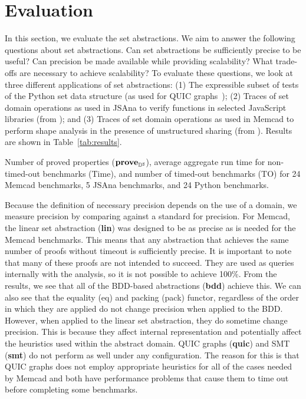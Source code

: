 \section{Evaluation}
\label{sec:evaluation}

In this section, we evaluate the set abstractions.  We aim to answer the following questions about set abstractions. Can set abstractions be sufficiently precise to be useful? Can precision be made available while providing scalability? What trade-offs are necessary to achieve scalability?  To evaluate these questions, we look at three different applications of set abstractions: (1) The expressible subset of tests of the Python set data structure (as used for QUIC graphs~\cite{ab:ecoop:13}); (2) Traces of set domain operations as used in JSAna to verify functions in selected JavaScript libraries (from \cite{hoo:14:sas,desync:15:esop}); and (3) Traces of set domain operations as used in Memcad to perform shape analysis in the presence of unstructured sharing (from \cite{memcad:15:sas}).  Results are shown in Table~\ref{tab:results}.

\begin{table}[t]
    \caption{Number of proved properties ($\textbf{prove}_{{\mathbb{D}}^{\sharp}}$), average aggregate run time for non-timed-out benchmarks (Time), and number of timed-out benchmarks (TO) for 24 Memcad benchmarks, 5 JSAna benchmarks, and 24 Python benchmarks.}
    \label{tab:results}
    
\end{table}

Because the definition of necessary precision depends on the use of a domain, we measure precision by comparing against a standard for precision.  For Memcad, the linear set abstraction (\textbf{lin}) was designed to be as precise as is needed for the Memcad benchmarks.  This means that any abstraction that achieves the same number of proofs without timeout is sufficiently precise.  It is important to note that many of these proofs are not intended to succeed.  They are used as queries internally with the analysis, so it is not possible to achieve 100\%.  From the results, we see that all of the BDD-based abstractions (\textbf{bdd}) achieve this.  We can also see that the equality (eq) and packing (pack) functor, regardless of the order in which they are applied do not change precision when applied to the BDD.  However, when applied to the linear set abstraction, they do sometime change precision.  This is because they affect internal representation and potentially affect the heuristics used within the abstract domain.  QUIC graphs (\textbf{quic}) and SMT (\textbf{smt}) do not perform as well under any configuration.  The reason for this is that QUIC graphs does not employ appropriate heuristics for all of the cases needed by Memcad and both have performance problems that cause them to time out before completing some benchmarks.

